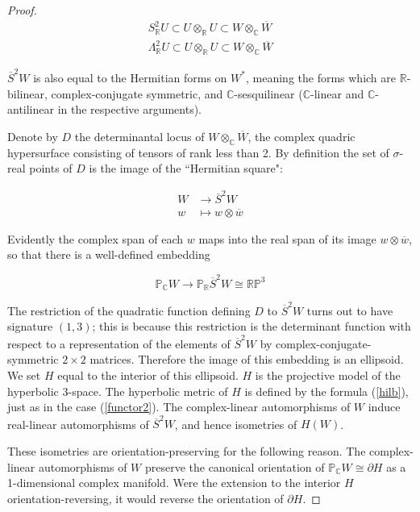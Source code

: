 \documentclass[11pt]{article}
\numberwithin{equation}{section}
\theoremstyle{plain}
\theoremstyle{remark}
\renewcommand{\P}{\mathbb{P}}
\renewcommand{\L}{\Lambda}
\newcommand{\R}{\mathbb{R}}
\newcommand{\C}{\mathbb{C}}
\begin{document}
\begin{proof}
\begin{align*}
 S^{2}_{\R}U \subset U\otimes_{\R}U\subset W\otimes_{\C}\overline{W}\\
\L^{2}_{\R}U \subset U\otimes_{\R}U\subset W\otimes_{\C}\overline{W}
\end{align*}

$\overline{S}^{2}W$ is also equal to the Hermitian forms on $W^{*}$, meaning the forms which are $\R$-bilinear, complex-conjugate symmetric, and $\C$-sesquilinear ($\C$-linear and $\C$-antilinear in the respective arguments).

Denote by $D$ the determinantal locus of $W\otimes_{\C}\overline{W}$, the complex quadric hypersurface consisting of tensors of rank less than 2. By definition the set of $\sigma$-real points of $D$ is the image of the ``Hermitian square":

\begin{align*}
W & \rightarrow  \overline{S}^{2}W \\
w & \mapsto w\otimes \overline{w} 
\end{align*}

Evidently the complex span of each $w$ maps into the real span of its image $w\otimes \overline{w}$, so that there is a well-defined embedding

\[\mathbb{P}_{\mathbb{C}}W\rightarrow  \mathbb{P}_{\R}\overline{S}^{2}W\cong \mathbb{RP}^{3}\]

The restriction of the quadratic function defining $D$ to $\overline{S}^{2}W$  turns out to have signature $(1,3)$; this is because this restriction is the determinant function with respect to a representation of the elements of $\overline{S}^{2}W$ by complex-conjugate-symmetric $2\times 2$ matrices. Therefore the image of this embedding is an ellipsoid. We set $H$ equal to the interior of this ellipsoid. $H$ is the projective model of the hyperbolic 3-space. The hyperbolic metric of $H$ is defined by the formula (\ref{hilb}), just as in the case (\ref{functor2}). The complex-linear automorphisms of $W$ induce real-linear automorphisms of $\overline{S}^{2}W$, and hence isometries of $H(W)$.

These isometries are orientation-preserving for the following reason. The complex-linear automorphisms of $W$ preserve the canonical orientation of $\P_{\C}W\cong \partial H$ as a 1-dimensional complex manifold. Were the extension to the interior $H$ orientation-reversing, it would reverse the orientation of $\partial H$.
\end{proof}
\end{document}
